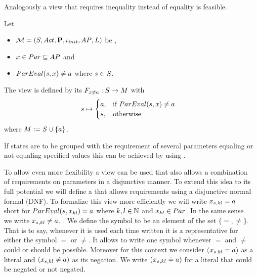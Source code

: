 \documentclass[preview]{standalone}
\begin{document}
Analogously a view that requires inequality instead of equality is feasible.

\begin{definition}
	Let
	\begin{itemize}
		\item $\chgph = \chgphtuple$ be \chosengraphtypeN,
		\item $\param \in \params \subseteq \atomicprops$ and 
		\item $\parameval(\state, \param) \neq \paramval$ where $\state \in \states$.		
	\end{itemize} 
	The view \viewparamvaluesneq is defined by its \grpfctN $\gfctparamvaluesneq : \states \to \imggrp$ with
	\[
	\state \mapsto
	\begin{cases}
		\paramval, &\text{if } \parameval(\state, \param) \neq \paramval\\
		\remelem, 	&\text{otherwise}
	\end{cases}
	\]
	where $\imggrp := \remset \cup \{a\}$.
\end{definition}

If states are to be grouped with the requirement of several parameters equaling or not equaling specified values this can be achieved by using \parllcompN. 

To allow even more flexibility a view can be used that also allows a combination of requirements on parameters in a disjunctive manner. To extend this idea to its full potential we will define a \viewN that allows requirements using a disjunctive normal formal (DNF). To formalize this view more efficiently we will write $\paramstate[,kl] = \paramval$ short for $\parameval(\state, \param_{kl}) = \paramval$ where $k,l \in \natnums$ and $x_{kl} \in \params$. In the same sense we write $\paramstate[,kl] \neq \paramval$. . We define the symbol \eqorneq to be an element of the set $\{=,\neq\}$. That is to say, whenever it is used each time written it is a representative for either the symbol $=$ or $\neq$. It allows to write one symbol whenever $=$ and $\neq$ could or should be possible. Moreover for this context we consider $(\paramstate[,kl] = \paramval)$ as a literal and $(\paramstate[,kl] \neq \paramval)$ as its negation. We write $(\paramstate[,kl] \eqorneq \paramval)$ for a literal that could be negated or not negated.
\end{document}
